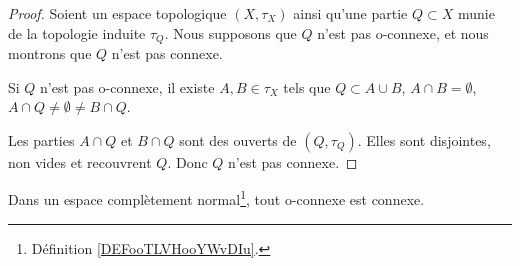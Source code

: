 \begin{proof}
	Soient un espace topologique \( (X,\tau_X)\) ainsi qu'une partie \( Q\subset X\) munie de la topologie induite \( \tau_Q\). Nous supposons que \( Q\) n'est pas o-connexe, et nous montrons que \( Q\) n'est pas connexe.

	Si \( Q\) n'est pas o-connexe, il existe \( A,B\in \tau_X\) tels que \(  Q\subset A\cup B\), \( A\cap B=\emptyset\), \( A\cap Q\neq\emptyset\neq B\cap Q\).

	Les parties \( A\cap Q\) et \( B\cap Q\) sont des ouverts de \( (Q,\tau_Q)\). Elles sont disjointes, non vides et recouvrent \( Q\). Donc \( Q\) n'est pas connexe.
\end{proof}

\begin{proposition}	\label{PROPooAHWNooXhrqnd}
	Dans un espace complètement normal\footnote{Définition \ref{DEFooTLVHooYWvDIu}.}, tout o-connexe est connexe.
\end{proposition}


